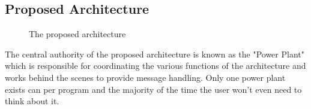 \documentclass[english,12pt]{scrartcl}
\begin{document}
            
        \subsection{Proposed Architecture}
        
            \begin{figure}[h]
                \centering
                \caption {The proposed architecture}
                \label{fig:HighLevelProposedArchitecture}
            \end{figure}

            The central authority of the proposed architecture is known as the "Power Plant" which
            is responsible for coordinating the various functions of the architecture and works
            behind the scenes to provide message handling. Only one power plant exists can per
            program and the majority of the time the user won't even need to think about it. 
            
\end{document}
